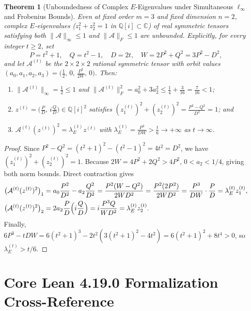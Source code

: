 \documentclass[11pt]{article}
\newtheorem{theorem}{Theorem}[section]
\theoremstyle{definition}
\newcommand{\Q}{\mathbb{Q}}
\newcommand{\C}{\mathbb{C}}
\newcommand{\cA}{\mathcal{A}}
\begin{document}
\begin{theorem}[Unboundedness of Complex $E$-Eigenvalues under Simultaneous $\ell_\infty$ and Frobenius Bounds]\label{thm:complex-E}
Even at fixed order $m = 3$ and fixed dimension $n = 2$, complex $E$-eigenvalues
($z_1^2 + z_2^2 = 1$ in $\Q[i] \subset \C$) of real symmetric tensors satisfying \emph{both}
$\|\cA\|_\infty \le 1$ and $\|\cA\|_F \le 1$ are unbounded. Explicitly, for every integer
$t \ge 2$, set
\[
  P = t^2 + 1, \quad Q = t^2 - 1, \quad D = 2t, \quad W = 2 P^2 + Q^2 = 3 P^2 - D^2,
\]
and let $\cA^{(t)}$ be the $2 \times 2 \times 2$ rational symmetric tensor with orbit values
$(a_0, a_1, a_2, a_3) = \bigl(\frac{1}{2},\, 0,\, \frac{P^2}{2W},\, 0\bigr)$. Then:
\begin{enumerate}
  \item $\|\cA^{(t)}\|_\infty = \frac{1}{2} \le 1$ and
  $\|\cA^{(t)}\|_F^2 = a_0^2 + 3 a_2^2 \le \frac{1}{4} + \frac{3}{16} = \frac{7}{16} < 1$;
  \item $z^{(t)} = \bigl(\frac{P}{D},\, i \frac{Q}{D}\bigr) \in \Q[i]^2$ satisfies
  $(z_1^{(t)})^2 + (z_2^{(t)})^2 = \frac{P^2 - Q^2}{D^2} = 1$; and
  \item $\cA^{(t)} (z^{(t)})^2 = \lambda_E^{(t)} z^{(t)}$ with
  $\lambda_E^{(t)} = \frac{P^3}{D W} > \frac{t}{6} \to +\infty$ as $t \to \infty$.
\end{enumerate}
\end{theorem}

\begin{proof}
Since $P^2 - Q^2 = (t^2+1)^2 - (t^2-1)^2 = 4 t^2 = D^2$, we have $(z_1^{(t)})^2 + (z_2^{(t)})^2 = 1$.
Because $2W = 4 P^2 + 2 Q^2 > 4 P^2$, $0 < a_2 < 1/4$, giving both norm bounds. Direct contraction
gives
\begin{align*}
  \bigl(\cA^{(t)} (z^{(t)})^2\bigr)_1
    &= a_0 \frac{P^2}{D^2} - a_2 \frac{Q^2}{D^2}
     = \frac{P^2 (W - Q^2)}{2 W D^2}
     = \frac{P^2 (2 P^2)}{2 W D^2}
     = \frac{P^3}{D W} \cdot \frac{P}{D} = \lambda_E^{(t)} z_1^{(t)}, \\
  \bigl(\cA^{(t)} (z^{(t)})^2\bigr)_2
    &= 2 a_2 \frac{P}{D} \Bigl(i \frac{Q}{D}\Bigr)
     = i \frac{P^3 Q}{W D^2} = \lambda_E^{(t)} z_2^{(t)}.
\end{align*}
Finally, $6 P^3 - t D W = 6(t^2+1)^3 - 2t^2(3(t^2+1)^2 - 4t^2) = 6(t^2+1)^2 + 8 t^4 > 0$, so
$\lambda_E^{(t)} > t/6$.
\end{proof}

\section{Core Lean 4.19.0 Formalization Cross-Reference}
\end{document}
